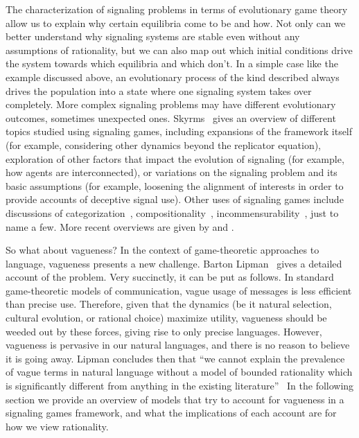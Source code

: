 \documentclass[a4paper]{article}
\begin{document}
The characterization of signaling problems in terms of evolutionary game theory allow us to explain why certain equilibria come to be and how.
Not only can we better understand why signaling systems are stable even without any assumptions of rationality, but we can also map out which initial conditions drive the system towards which equilibria and which don't.
In a simple case like the example discussed above, an evolutionary process of the kind described always drives the population into a state where one signaling system takes over completely. %
More complex signaling problems may have different evolutionary outcomes, sometimes unexpected ones.
Skyrms~\parencite*{skyrms_signals_2010} gives an overview of different topics studied using signaling games, including expansions of the framework itself (for example, considering other dynamics beyond the replicator equation), exploration of other factors that impact the evolution of signaling (for example, how agents are interconnected), or variations on the signaling problem and its basic assumptions (for example, loosening the alignment of interests in order to provide accounts of deceptive signal use).
Other uses of signaling games include discussions of categorization~\parencite[\emph{e.g.}][]{jager_language_2007}, compositionality~\parencite[\emph{e.g.}][]{barrett_evolution_2009}, incommensurability~\parencite[\emph{e.g.}][]{barrett_faithful_2010}, just to name a few.
More recent overviews are given by \textcites{huttegger_how_2014} and \textcite{huttegger_dynamics_2014}.

So what about vagueness?
In the context of game-theoretic approaches to language, vagueness presents a new challenge.
Barton Lipman~\parencite*{lipman_why_2009} gives a detailed account of the problem.
Very succinctly, it can be put as follows.
In standard game-theoretic models of communication, vague usage of messages is less efficient than precise use.
Therefore, given that the dynamics (be it natural selection, cultural evolution, or rational choice) maximize utility, vagueness should be weeded out by these forces, giving rise to only precise languages.
However, vagueness is pervasive in our natural languages, and there is no reason to believe it is going away.
Lipman concludes then that ``we cannot explain the prevalence of vague terms in natural language without a model of bounded rationality which is significantly different from anything in the existing literature''~\parencite*[1]{lipman_why_2009}
In the following section we provide an overview of models that try to account for vagueness in a signaling games framework, and what the implications of each account are for how we view rationality.
\end{document}

